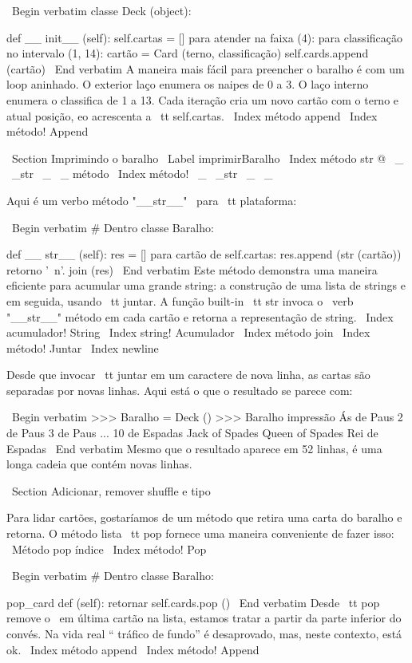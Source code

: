 \documentclass[10pt]{book}
\begin{document}
\begin {itemize}
{{{{{{{{{{{{{{{{\ Begin {verbatim}
classe Deck (object):

    def __ init__ (self):
        self.cartas = []
        para atender na faixa (4):
            para classificação no intervalo (1, 14):
                cartão = Card (terno, classificação)
                self.cards.append (cartão)
\ End {verbatim}
%
A maneira mais fácil para preencher o baralho é com um loop aninhado. O exterior
laço enumera os naipes de 0 a 3. O laço interno enumera o
classifica de 1 a 13. Cada iteração
cria um novo cartão com o terno e atual posição,
eo acrescenta a {\ tt self.cartas}.
\ Index {método append}
\ Index {método! Append}


\ Section {Imprimindo o baralho}
\ Label {} imprimirBaralho
\ Index {método str @ \ _ \ _str \ _ \ _ método}
\ Index {método! \ _ \ _str \ _ \ _}

Aqui é um verbo método "__str__" \ para {\ tt plataforma}:

\ Begin {verbatim}
# Dentro classe Baralho:

    def __ str__ (self):
        res = []
        para cartão de self.cartas:
            res.append (str (cartão))
        retorno '\ n'. join (res)
\ End {verbatim}
%
Este método demonstra uma maneira eficiente para acumular uma grande
string: a construção de uma lista de strings e em seguida, usando {\ tt juntar}.
A função built-in {\ tt str} invoca o \ verb "__str__"
método em cada cartão e retorna a representação de string.
\ Index {acumulador! String}
\ Index {string! Acumulador}
\ Index {método join}
\ Index {método! Juntar}
\ Index {newline}

Desde que invocar {\ tt juntar} em um caractere de nova linha, as cartas
são separadas por novas linhas. Aqui está o que o resultado se parece com:

\ Begin {verbatim}
>>> Baralho = Deck ()
>>> Baralho impressão
Ás de Paus
2 de Paus
3 de Paus
...
10 de Espadas
Jack of Spades
Queen of Spades
Rei de Espadas
\ End {verbatim}
%
Mesmo que o resultado aparece em 52 linhas, é
uma longa cadeia que contém novas linhas.


\ Section {Adicionar, remover shuffle e tipo}

Para lidar cartões, gostaríamos de um método que
retira uma carta do baralho e retorna.
O método lista {\ tt pop} fornece uma maneira conveniente de fazer isso:
\ {Método pop} índice
\ Index {método! Pop}

\ Begin {verbatim}
# Dentro classe Baralho:

    pop_card def (self):
        retornar self.cards.pop ()
\ End {verbatim}
%
Desde {\ tt pop} remove o {\ em última} cartão na lista, estamos
tratar a partir da parte inferior do convés. Na vida real `` tráfico de fundo'' é
desaprovado,
mas, neste contexto, está ok.
\ Index {método append}
\ Index {método! Append}

}}}}}}}}}}}}}}}}
\end{itemize}
\end{document}

